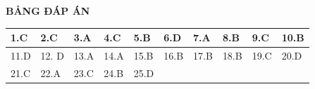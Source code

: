 	\hideall
{
	\begin{center}
		\textbf{BẢNG ĐÁP ÁN}
	\end{center}
	\begin{center}
		\begin{tabular}{|m{2.8em}|m{2.8em}|m{2.8em}|m{2.8em}|m{2.8em}|m{2.8em}|m{2.8em}|m{2.8em}|m{2.8em}|m{2.8em}|}
			\hline
			1.C  & 2.C  & 3.A  & 4.C  & 5.B  & 6.D  & 7.A  & 8.B  & 9.C  & 10.B  \\
			\hline
			11.D  & 12. D  & 13.A  & 14.A  & 15.B  & 16.B  & 17.B  & 18.B  & 19.C  & 20.D  \\
			\hline
			21.C  & 22.A  & 23.C  & 24.B  & 25.D  &   &   &   &   &  \\
			\hline
		\end{tabular}
	\end{center}
}